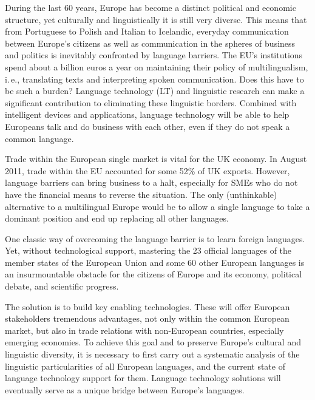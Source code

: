 \documentclass[]{../../metanetpaper}
\begin{document}
\begin{multicols}{2}
During the last 60 years, Europe has become a distinct political and economic structure, yet culturally and linguistically it is still very diverse. This means that from Portuguese to Polish and Italian to Icelandic, everyday communication between Europe's citizens as well as communication in the spheres of business and politics is inevitably confronted by language barriers. The EU's institutions spend about a billion euros a year on maintaining their policy of multilingualism, i.\,e., translating texts and interpreting spoken communication. Does this have to be such a burden? Language technology (LT) and linguistic research can make a significant contribution to eliminating these linguistic borders. Combined with intelligent devices and applications, language technology will be able to help Europeans talk and do business with each other, even if they do not speak a common language. 


Trade within the European single market is vital for the UK economy. In August 2011, trade within the EU accounted for some 52\% of UK exports. However, language barriers can bring business to a halt, especially for SMEs who do not have the financial means to reverse the situation. The only (unthinkable) alternative to a multilingual Europe would be to allow a single language to take a dominant position and end up replacing all other languages. 
    
One classic way of overcoming the language barrier is to learn foreign languages. Yet, without technological support, mastering the 23 official languages of the member states of the European Union and some 60 other European languages is an insurmountable obstacle for the citizens of Europe and its economy, political debate, and scientific progress.   
    
The solution is to build key enabling technologies. These will offer European stakeholders tremendous advantages, not only within the common European market, but also in trade relations with non-European countries, especially emerging economies.  To achieve this goal and to preserve Europe's cultural and linguistic diversity, it is necessary to first carry out a systematic analysis of the linguistic particularities of all European languages, and the current state of language technology support for them. Language technology solutions will eventually serve as a unique bridge between Europe's languages. 


\end{multicols}
\end{document}
